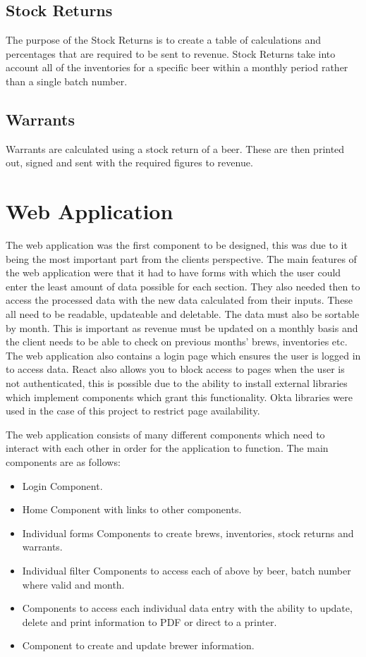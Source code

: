 \subsection{Stock Returns}
The purpose of the Stock Returns is to create a table of calculations and percentages that are required to be sent to revenue. Stock Returns take into account all of the inventories for a specific beer within a monthly period rather than a single batch number.

\subsection{Warrants}
Warrants are calculated using a stock return of a beer. These are then printed out, signed and sent with the required figures to revenue. 

\section{Web Application}
The web application was the first component to be designed, this was due to it being the most important part from the clients perspective. The main features of the web application were that it had to have forms with which the user could enter the least amount of data possible for each section. They also needed then to access the processed data with the new data calculated from their inputs. These all need to be readable, updateable and deletable. The data must also be sortable by month. This is important as revenue must be updated on a monthly basis and the client needs to be able to check on previous months' brews, inventories etc. The web application also contains a login page which ensures the user is logged in to access data. React also allows you to block access to pages when the user is not authenticated, this is possible due to the ability to install external libraries which implement components which grant this functionality. Okta libraries were used in the case of this project to restrict page availability. \par
The web application consists of many different components which need to interact with each other in order for the application to function. The main components are as follows:
\begin{itemize}
    \item Login Component.
    \item Home Component with links to other components.
    \item Individual forms Components to create brews, inventories, stock returns and warrants.
    \item Individual filter Components to access each of above by beer, batch number where valid and month.
    \item Components to access each individual data entry with the ability to update, delete and print information to PDF or direct to a printer.
    \item Component to create and update brewer information.
\end{itemize}
